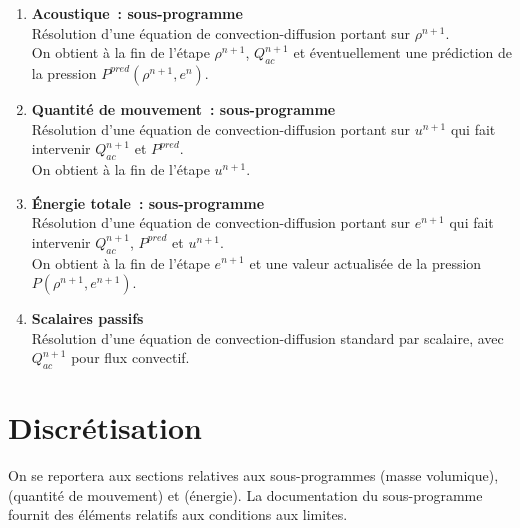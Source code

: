 \begin{enumerate}

  \item {\bf Acoustique~: sous-programme } \\
     Résolution d'une équation de convection-diffusion portant sur $\rho^{n+1}$.\\
     On obtient à la fin de l'étape $\rho^{n+1}$, $Q^{n+1}_{ac}$ et
éventuellement une
prédiction de la pression $P^{pred}(\rho^{n+1},e^{n})$.\\

  \item {\bf Quantité de mouvement~: sous-programme }\\
     Résolution d'une équation de convection-diffusion portant sur $u^{n+1}$ qui
     fait intervenir  $Q^{n+1}_{ac}$ et $P^{pred}$.\\
     On obtient à la fin de l'étape $u^{n+1}$.\\

  \item {\bf Énergie totale~: sous-programme }\\
     Résolution d'une équation de convection-diffusion portant sur $e^{n+1}$ qui
     fait intervenir  $Q^{n+1}_{ac}$, $P^{pred}$ et  $u^{n+1}$.\\
     On obtient à la fin de l'étape $e^{n+1}$ et une valeur actualisée de la
pression $P(\rho^{n+1},e^{n+1})$.\\

  \item {\bf Scalaires passifs}\\
     Résolution d'une équation de convection-diffusion standard par
     scalaire, avec  $Q^{n+1}_{ac}$ pour flux convectif.
\end{enumerate}

\section*{Discrétisation}

On se reportera aux sections relatives aux sous-programmes
 (masse volumique), 
(quantité de mouvement) et  (énergie).
La documentation du sous-programme
 fournit des éléments relatifs aux
conditions
aux limites.

